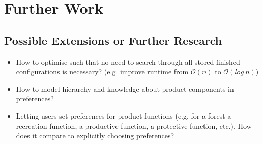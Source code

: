 \chapter{Further Work}
\label{ch:FurtherWork}

\section{Possible Extensions or Further Research}
\label{sec:FurtherWork:PossibleExtensions}

\begin{itemize}
    \item How to optimise such that no need to search through all stored finished configurations is necessary? (e.g. improve runtime from $\mathcal{O}(n)$ to $\mathcal{O}(log\ n)$)
    \item How to model hierarchy and knowledge about product components in preferences?
    \item Letting users set preferences for product functions (e.g. for a forest a recreation function, a productive function, a protective function, etc.). How does it compare to explicitly choosing preferences?
\end{itemize}